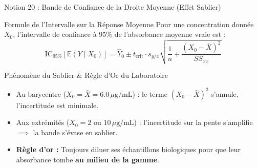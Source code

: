 \documentclass[aspectratio=169,10pt]{beamer}
\begin{document}
\begin{frame}{Notion 20 : Bande de Confiance de la Droite Moyenne (Effet Sablier)}
  \begin{conceptbox}{Formule de l'Intervalle sur la Réponse Moyenne}
    \footnotesize
    Pour une concentration donnée $X_0$, l'intervalle de confiance à 95\% de l'absorbance moyenne vraie est :
    \begin{equation*}
      \text{IC}_{95\%}[\mathbb{E}(Y \mid X_0)] = \hat{Y}_0 \pm t_{\text{crit}} \cdot s_{y/x} \sqrt{\frac{1}{n} + \frac{(X_0 - \bar{X})^2}{SS_{xx}}}
    \end{equation*}
  \end{conceptbox}
  \vspace{1mm}
  \begin{biobox}{Phénomène du Sablier \& Règle d'Or du Laboratoire}
    \footnotesize
    \begin{itemize}
      \item Au barycentre ($X_0 = \bar{X} = 6.0\,\mu\text{g/mL}$) : le terme $(X_0 - \bar{X})^2$ s'annule, l'incertitude est minimale.
      \item Aux extrémités ($X_0 = 2$ ou $10\,\mu\text{g/mL}$) : l'incertitude sur la pente s'amplifie $\implies$ la bande s'évase en sablier.
      \item \textbf{Règle d'or :} Toujours diluer ses échantillons biologiques pour que leur absorbance tombe \textbf{au milieu de la gamme}.
    \end{itemize}
  \end{biobox}
\end{frame}
\end{document}
